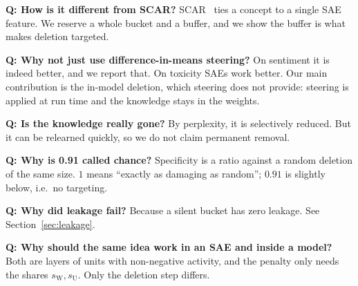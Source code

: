 \documentclass[11pt,a4paper]{article}
\theoremstyle{definition}
\newcommand{\Wb}{\mathrm{W}}
\newcommand{\Ub}{\mathrm{U}}
\begin{document}
\textbf{Q: How is it different from SCAR?} SCAR~\cite{harle2024scar} ties a concept to a single
SAE feature. We reserve a whole bucket and a buffer, and we show the buffer is what makes deletion
targeted.

\textbf{Q: Why not just use difference-in-means steering?} On sentiment it is indeed better, and we
report that. On toxicity SAEs work better. Our main contribution is the in-model deletion, which
steering does not provide: steering is applied at run time and the knowledge stays in the weights.

\textbf{Q: Is the knowledge really gone?} By perplexity, it is selectively reduced. But it can be
relearned quickly, so we do not claim permanent removal.

\textbf{Q: Why is 0.91 called chance?} Specificity is a ratio against a random deletion of the same
size. $1$ means ``exactly as damaging as random''; $0.91$ is slightly below, i.e.\ no targeting.

\textbf{Q: Why did leakage fail?} Because a silent bucket has zero leakage. See
Section~\ref{sec:leakage}.

\textbf{Q: Why should the same idea work in an SAE and inside a model?} Both are layers of units
with non-negative activity, and the penalty only needs the shares $s_{\Wb},s_{\Ub}$. Only the
deletion step differs.

\end{document}
